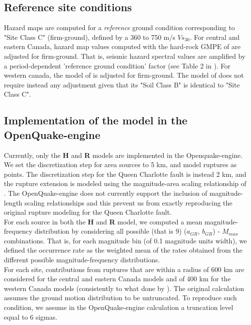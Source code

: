\subsection{Reference site conditions}
Hazard maps are computed for a \textit{reference} ground condition corresponding to "Site Class C" (firm-ground), defined by a 360 to 750 m/s $Vs_{30}$. For central and eastern Canada, hazard map values computed with the hard-rock GMPE of \cite{ab1995} are adjusted for firm-ground. That is, seismic hazard spectral values are amplified by a period-dependent 'reference ground condition' factor (see Table 2 in \cite{adams2003}). For western canada, the model of \cite{y1997} is adjusted for firm-ground. The model of \cite{bjf1993} does not require instead any adjustment given that its "Soil Class B" is identical to "Site Class C".

\subsection{Implementation of the model in the OpenQuake-engine}
Currently, only the \textbf{H} and \textbf{R} models are implemented in the Openquake-engine. We set the discretization step for area sources to 5 km, and model ruptures as points. The discretization step for the Queen Charlotte fault is instead 2 km, and the rupture extension is modeled using the magnitude-area scaling relationship of \cite{wells1994}. The OpenQuake-engine does not currently support the inclusion of magnitude-length scaling relationships and this prevent us from exactly reproducing the original rupture modeling for the Queen Charlotte fault. \\
For each source in both the \textbf{H} and \textbf{R} model, we computed a mean magnitude-frequency distribution by considering all possible (that is 9) ($a_{GR}$, $b_{GR}$) - $M_{max}$ combinations. That is, for each magnitude bin (of 0.1 magnitude units width), we defined the occurrence rate as the weighted mean of the rates obtained from the different possible magnitude-frequency distributions.\\
For each site, contributions from ruptures that are within a radius of 600 km are considered for the central and eastern Canada models and of 400 km for the western Canada models (consistently to what done by \cite{adams2003}). The original calculation assumes the ground motion distribution to be untruncated. To reproduce such condition, we assume in the OpenQuake-engine calculation a truncation level equal to 6 sigmas.

